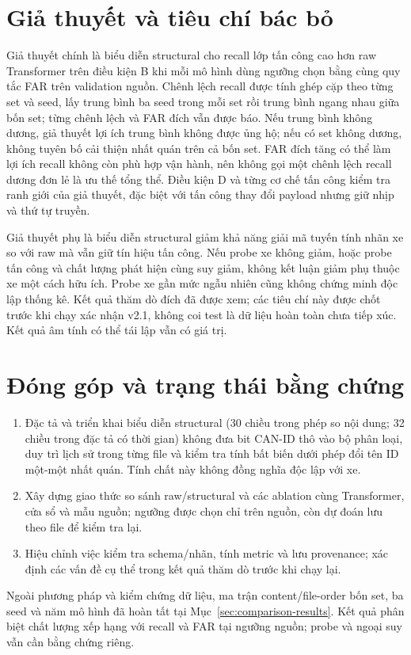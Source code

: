 \documentclass[12pt,a4paper,oneside,openany]{extbook}
\begin{document}
\section{Giả thuyết và tiêu chí bác bỏ}
Giả thuyết chính là biểu diễn structural cho recall lớp tấn công cao hơn raw Transformer trên điều kiện B khi mỗi mô hình dùng ngưỡng chọn bằng cùng quy tắc FAR trên validation nguồn. Chênh lệch recall được tính ghép cặp theo từng set và seed, lấy trung bình ba seed trong mỗi set rồi trung bình ngang nhau giữa bốn set; từng chênh lệch và FAR đích vẫn được báo. Nếu trung bình không dương, giả thuyết lợi ích trung bình không được ủng hộ; nếu có set không dương, không tuyên bố cải thiện nhất quán trên cả bốn set. FAR đích tăng có thể làm lợi ích recall không còn phù hợp vận hành, nên không gọi một chênh lệch recall dương đơn lẻ là ưu thế tổng thể. Điều kiện D và từng cơ chế tấn công kiểm tra ranh giới của giả thuyết, đặc biệt với tấn công thay đổi payload nhưng giữ nhịp và thứ tự truyền.

Giả thuyết phụ là biểu diễn structural giảm khả năng giải mã tuyến tính nhãn xe so với raw mà vẫn giữ tín hiệu tấn công. Nếu probe xe không giảm, hoặc probe tấn công và chất lượng phát hiện cùng suy giảm, không kết luận giảm phụ thuộc xe một cách hữu ích. Probe xe gần mức ngẫu nhiên cũng không chứng minh độc lập thống kê. Kết quả thăm dò đích đã được xem; các tiêu chí này được chốt trước khi chạy xác nhận v2.1, không coi test là dữ liệu hoàn toàn chưa tiếp xúc. Kết quả âm tính có thể tái lập vẫn có giá trị.

\section{Đóng góp và trạng thái bằng chứng}
\begin{enumerate}
\item Đặc tả và triển khai biểu diễn structural (30 chiều trong phép so nội dung; 32 chiều trong đặc tả có thời gian) không đưa bit CAN-ID thô vào bộ phân loại, duy trì lịch sử trong từng file và kiểm tra tính bất biến dưới phép đổi tên ID một-một nhất quán. Tính chất này không đồng nghĩa độc lập với xe.
\item Xây dựng giao thức so sánh raw/structural và các ablation cùng Transformer, cửa sổ và mẫu nguồn; ngưỡng được chọn chỉ trên nguồn, còn dự đoán lưu theo file để kiểm tra lại.
\item Hiệu chỉnh việc kiểm tra schema/nhãn, tính metric và lưu provenance; xác định các vấn đề cụ thể trong kết quả thăm dò trước khi chạy lại.
\end{enumerate}
Ngoài phương pháp và kiểm chứng dữ liệu, ma trận content/file-order bốn set, ba seed và năm mô hình đã hoàn tất tại Mục~\ref{sec:comparison-results}. Kết quả phân biệt chất lượng xếp hạng với recall và FAR tại ngưỡng nguồn; probe và ngoại suy vẫn cần bằng chứng riêng.
\end{document}
